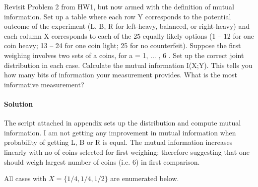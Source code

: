 \documentclass[]{article}
\begin{document}
Revisit Problem 2 from HW1, but now armed with the definition of mutual
information. Set up a table where each row Y corresponds to the potential
outcome of the experiment (L, B, R for left-heavy, balanced, or right-heavy) and
each column X corresponds to each of the 25 equally likely options (1 – 12 for
one coin heavy; 13 – 24 for one coin light; 25 for no counterfeit).  Suppose the
first weighing involves two sets of a coins, for a = 1, ... , 6 . Set up the
correct joint distribution in each case. Calculate the mutual information
I(X;Y). This tells you how many bits of information your measurement provides.
What is the most informative measurement?

\paragraph{Solution}

The script attached in appendix sets up the distribution and compute mutual
information. I am not getting any improvement in mutual information when
probability of getting L, B or R is equal. The mutual information increases
linearly with no of coins selected for first weighing; therefore suggesting that
one should weigh largest number of coins (i.e. 6) in first comparison.

All cases with $X=\{1/4,1/4,1/2\}$ are enumerated below.




\end{document}
